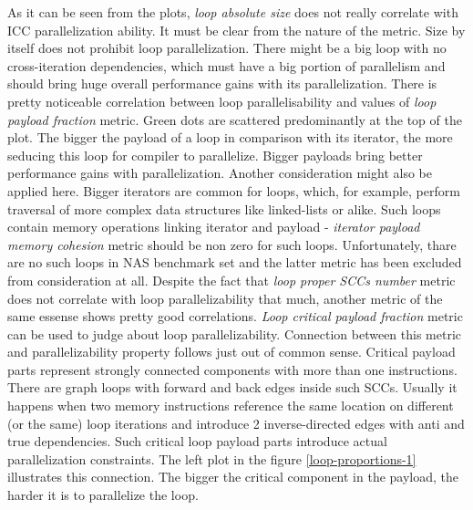 \null\qquad As it can be seen from the plots, \textit{loop absolute size} does not really correlate with ICC parallelization ability. It must be clear from the nature of the metric. Size by itself does not prohibit loop parallelization. There might be a big loop with no cross-iteration dependencies, which must have a big portion of parallelism and should bring huge overall performance gains with its parallelization. \newline
\null\qquad There is pretty noticeable correlation between loop parallelisability and values of \textit{loop payload fraction} metric. Green dots are scattered predominantly at the top of the plot. The bigger the payload of a loop in comparison with its iterator, the more seducing this loop for compiler to parallelize. Bigger payloads bring better performance gains with parallelization. Another consideration might also be applied here. Bigger iterators are common for loops, which, for example, perform traversal of more complex data structures like linked-lists or alike. Such loops contain memory operations linking iterator and payload - \textit{iterator payload memory cohesion} metric should be non zero for such loops. Unfortunately, thare are no such loops in NAS benchmark set and the latter metric has been excluded from consideration at all. \newline 
\null\qquad Despite the fact that \textit{loop proper SCCs number} metric does not correlate with loop parallelizability that much, another metric of the same essense shows pretty good correlations. \textit{Loop critical payload fraction} metric can be used to judge about loop parallelizability. Connection between this metric and parallelizability property follows just out of common sense. Critical payload parts represent strongly connected components with more than one instructions. There are graph loops with forward and back edges inside such SCCs. Usually it happens when two memory instructions reference the same location on different (or the same) loop iterations and introduce 2 inverse-directed edges with anti and true dependencies. Such critical loop payload parts introduce actual parallelization constraints. The left plot in the figure \ref{loop-proportions-1} illustrates this connection. The bigger the critical component in the payload, the harder it is to parallelize the loop.        

